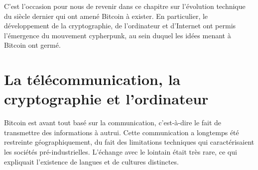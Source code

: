 C'est l'occasion pour nous de revenir dans ce chapitre sur l'évolution technique du siècle dernier qui ont amené Bitcoin à exister. En particulier, le développement de la cryptographie, de l'ordinateur et d'Internet ont permis l'émergence du mouvement cypherpunk, au sein duquel les idées menant à Bitcoin ont germé.

%


\section*{La télécommunication, la cryptographie et l'ordinateur}


Bitcoin est avant tout basé sur la communication, c'est-à-dire le fait de transmettre des informations à autrui. Cette communication a longtemps été restreinte géographiquement, du fait des limitations techniques qui caractérisaient les sociétés pré-industrielles. L'échange avec le lointain était très rare, ce qui expliquait l'existence de langues et de cultures distinctes.

